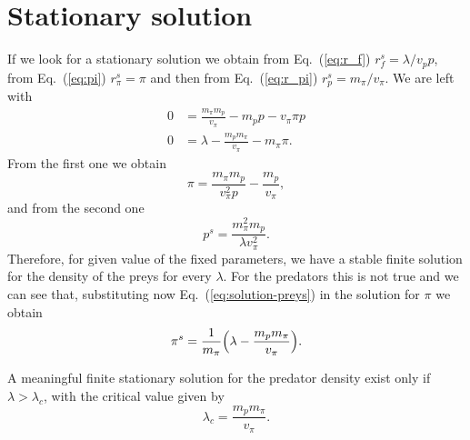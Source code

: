 \documentclass[10pt]{article}
\begin{document}
\section{Stationary solution}

If we look for a stationary solution we obtain from Eq.~(\ref{eq:r_f}) \(r_f^s=\lambda/v_pp\),
from Eq.~(\ref{eq:pi}) \(r_{\pi}^s=\pi\) and
then from Eq.~(\ref{eq:r_pi}) \(r_p^s=m_{\pi}/v_{\pi}\).
We are left with
\begin{align}
0&=\frac{m_{\pi}m_p}{v_{\pi}}-m_pp-v_{\pi}\pi p \\
0&=\lambda-\frac{m_pm_{\pi}}{v_{\pi}}-m_{\pi}\pi.
\end{align}
From the first one we obtain
\begin{equation}
\pi=\frac{m_{\pi}m_p}{v^2_{\pi}p}-\frac{m_p}{v_{\pi}},
\end{equation}
and from the second one
\begin{equation}
p^s=\frac{m^2_{\pi}m_p}{\lambda v^2_{\pi}}.
\label{eq:solution-preys}
\end{equation}
Therefore, for given value of the fixed parameters, we have a stable finite solution for the density
of the preys for every \(\lambda\). For the predators this is not true and we can see that,
substituting now Eq.~(\ref{eq:solution-preys}) in the solution for \(\pi\) we obtain
\begin{equation}
\pi^s=\frac{1}{m_{\pi}}\Bigl(\lambda-\frac{m_pm_{\pi}}{v_{\pi}}\Bigl).
\end{equation}

A meaningful finite stationary solution for the predator density exist only if 
\(\lambda>\lambda_c\), with the critical value given by
\begin{equation}
\lambda_c=\frac{m_pm_{\pi}}{v_{\pi}}.
\end{equation}




\end{document}
